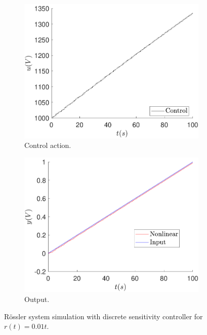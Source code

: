     \begin{figure}
        \centering
        \begin{subfigure}[b]{0.475\textwidth}
            \centering
            \includegraphics[scale=0.425]{files/heuristic/Sensitivity/control_sens_ramp_ref_0_01.pdf}
            \caption{Control action.}
        \end{subfigure}
        \vskip0.1cm
        \begin{subfigure}[b]{0.475\textwidth}   
            \centering
            \includegraphics[scale=0.425]{files/heuristic/Sensitivity/sens_ramp_ref_0_01.pdf}
            \caption{Output.}
        \end{subfigure}
        \caption{Rössler system simulation with discrete sensitivity controller for $r(t)=0.01t$.}
        \label{fig:sens_ref_0_01t}
	\end{figure}
    
